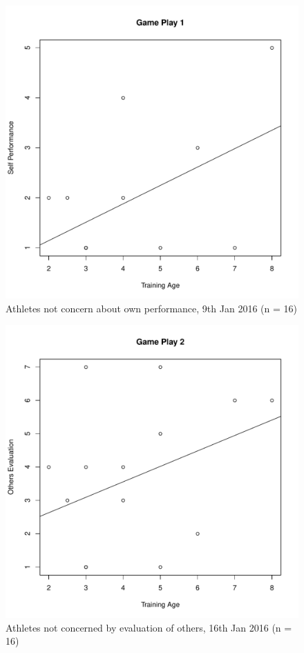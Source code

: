 \begin{CJK}{UTF8}{gbsn}
\begin{figure}[htbp]
  \centering
\includegraphics[scale=.5]{images/indPerf0109TrainingAge.pdf}
  \caption{Athletes not concern about own performance, 9th Jan 2016 (n = 16)}
  \label{fig:indPerf0109TrainingAge}
\end{figure}


\begin{figure}[htbp]
  \centering
\includegraphics[scale=.5]{images/othersEval0116TrainingAge.pdf}
  \caption{Athletes not concerned by evaluation of others, 16th Jan 2016 (n = 16)}
  \label{fig:othersEval0116TrainingAge}
\end{figure}


\end{CJK}
